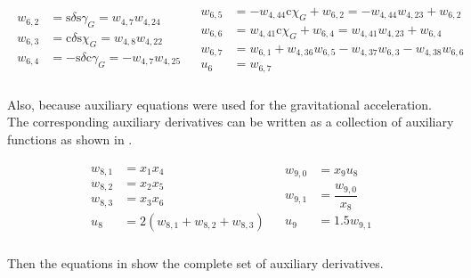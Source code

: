 \begin{align} \label{eq:u6AuxF}
\begin{split}
w_{6,2} &= \text{s}\delta \text{s}\gamma_{G} = w_{4,7}w_{4,24} \\
w_{6,3} &= \text{c}\delta \text{s}\chi_{G} = w_{4,8}w_{4,22} \\
w_{6,4} &= -\text{s}\delta \text{c}\gamma_{G} = -w_{4,7}w_{4,25} \\
\end{split}
&
\begin{split}
w_{6,5} &= -w_{4,44} \text{c}\chi_{G} +w_{6,2} = -w_{4,44}w_{4,23}+w_{6,2} \\
w_{6,6} &= w_{4,41} \text{c}\chi_{G} + w_{6,4} = w_{4,41}w_{4,23}+w_{6,4} \\
w_{6,7} &= w_{6,1} + w_{4,36}w_{6,5}-w_{4,37}w_{6,3}-w_{4,38}w_{6,6} \\
u_{6} &= w_{6,7} \\
\end{split}
\end{align}

\noindent
Also, because auxiliary equations were used for the gravitational acceleration. The corresponding auxiliary derivatives can be written as a collection of auxiliary functions as shown in .

\begin{align} \label{eq:u8u9AuxF}
\begin{split}
w_{8,1} &= x_{1}x_{4} \\
w_{8,2} &= x_{2}x_{5} \\
w_{8,3} &= x_{3}x_{6} \\
u_{8} &= 2\left(w_{8,1}+w_{8,2}+w_{8,3}\right) \\ 
\end{split}
&
\begin{split}
w_{9,0} &= x_{9}u_{8} \\
w_{9,1} &= \dfrac{w_{9,0}}{x_{8}} \\
u_{9} &= 1.5 w_{9,1} \\
\end{split}
\end{align}

\noindent
Then the equations in  show the complete set of auxiliary derivatives.

